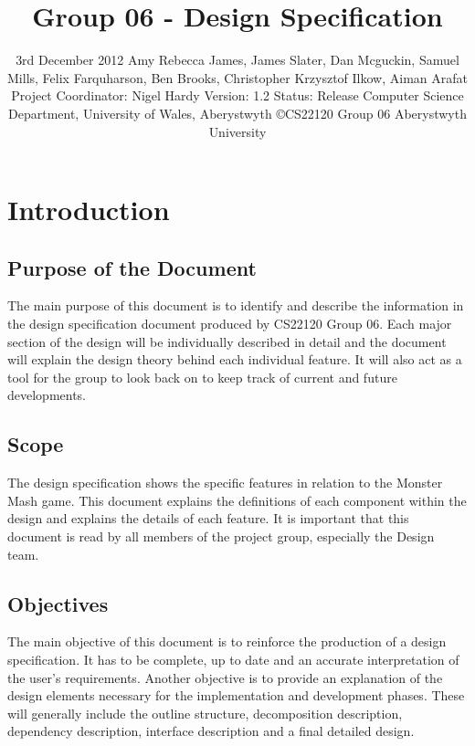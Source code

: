 \documentclass[titlepage]{article}
\title{Group 06 - Design Specification}
\date{3rd December 2012 \linebreak Amy Rebecca James, James Slater, Dan Mcguckin, Samuel Mills, Felix Farquharson, \linebreak Ben Brooks, Christopher Krzysztof Ilkow, Aiman Arafat \linebreak Project Coordinator: Nigel Hardy \linebreak Version: 1.2 \linebreak Status: Release \linebreak Computer Science Department, University of Wales, Aberystwyth \linebreak \copyright   CS22120 Group 06 Aberystwyth University}
\begin{document}
\maketitle
\tableofcontents
\newpage

\section{Introduction}
\subsection{Purpose of the Document}
The main purpose of this document is to identify and describe the information in the design specification document produced by CS22120 Group 06. Each major section of the design will be individually described in detail and the document will explain the design theory behind each individual feature. It will also act as a tool for the group to look back on to keep track of current and future developments.
\subsection{Scope}
The design specification shows the specific features in relation to the Monster Mash game. This document explains the definitions of each component within the design and explains the details of each feature. It is important that this document is read by all members of the project group, especially the Design team.
\subsection{Objectives}
The main objective of this document is to reinforce the production of a design specification. It has to be complete, up to date and an accurate interpretation of the user’s requirements. Another objective is to provide an explanation of the design elements necessary for the implementation and development phases. These will generally include the outline structure, decomposition description, dependency description, interface description and a final detailed design.
\end{document}
